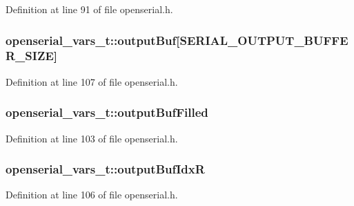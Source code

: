 Definition at line 91 of file openserial.\+h.

\subsubsection[{\texorpdfstring{output\+Buf}{outputBuf}}]{ openserial\+\_\+vars\+\_\+t\+::output\+Buf\mbox{[}{\bf S\+E\+R\+I\+A\+L\+\_\+\+O\+U\+T\+P\+U\+T\+\_\+\+B\+U\+F\+F\+E\+R\+\_\+\+S\+I\+ZE}\mbox{]}}\hypertarget{structopenserial__vars__t_a3f88c7c284a6a3dce9bb67ced44a9da3}{}\label{structopenserial__vars__t_a3f88c7c284a6a3dce9bb67ced44a9da3}


Definition at line 107 of file openserial.\+h.

\subsubsection[{\texorpdfstring{output\+Buf\+Filled}{outputBufFilled}}]{ openserial\+\_\+vars\+\_\+t\+::output\+Buf\+Filled}\hypertarget{structopenserial__vars__t_ac1d8a23992e69cea511d5336e2d04df4}{}\label{structopenserial__vars__t_ac1d8a23992e69cea511d5336e2d04df4}


Definition at line 103 of file openserial.\+h.

\subsubsection[{\texorpdfstring{output\+Buf\+IdxR}{outputBufIdxR}}]{ openserial\+\_\+vars\+\_\+t\+::output\+Buf\+IdxR}\hypertarget{structopenserial__vars__t_a1f210c5c7efe803f967a9f152f700c6f}{}\label{structopenserial__vars__t_a1f210c5c7efe803f967a9f152f700c6f}


Definition at line 106 of file openserial.\+h.

